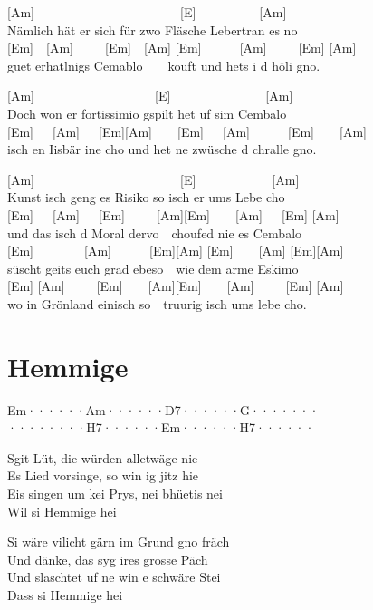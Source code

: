 \documentclass[
  letterpaper,
  a5paper]{memoir}
\begin{document}
{[}Am{]}~~~~~~~~~~~~~~~~~~~~~~~{[}E{]}~~~~~~~~~~{[}Am{]}\\
Nämlich hät er sich für zwo Fläsche Lebertran es no\\
{[}Em{]}~~{[}Am{]}~~~~~{[}Em{]}~~{[}Am{]}
{[}Em{]}~~~~~~{[}Am{]}~~~~~{[}Em{]} {[}Am{]}\\
guet erhatlnigs Cemablo~~~~kouft und hets i d höli gno.

{[}Am{]}~~~~~~~~~~~~~~~~~~~{[}E{]}~~~~~~~~~~~~~~~{[}Am{]}\\
Doch won er fortissimio gspilt het uf sim Cembalo\\
{[}Em{]}~~~{[}Am{]}~~~{[}Em{]}{[}Am{]}~~~~{[}Em{]}~~~{[}Am{]}~~~~~~{[}Em{]}~~~~{[}Am{]}\\
isch en Iisbär ine cho und het ne zwüsche d chralle gno.

{[}Am{]}~~~~~~~~~~~~~~~~~~~~~~~{[}E{]}~~~~~~~~~~~~{[}Am{]}\\
Kunst isch geng es Risiko so isch er ums Lebe cho\\
{[}Em{]}~~~{[}Am{]}~~~{[}Em{]}~~~~~{[}Am{]}{[}Em{]}~~~~{[}Am{]}~~~{[}Em{]}
{[}Am{]}\\
und das isch d Moral dervo~~choufed nie es Cembalo\\
{[}Em{]}~~~~~~~~{[}Am{]}~~~~~~{[}Em{]}{[}Am{]} {[}Em{]}~~~~{[}Am{]}
{[}Em{]}{[}Am{]}\\
süscht geits euch grad ebeso~~wie dem arme Eskimo\\
{[}Em{]}
{[}Am{]}~~~~~{[}Em{]}~~~~{[}Am{]}{[}Em{]}~~~~{[}Am{]}~~~~~{[}Em{]}
{[}Am{]}\\
wo in Grönland einisch so~~truurig isch ums lebe cho.

\hypertarget{hemmige}{%
\chapter{Hemmige}\label{hemmige}}

\textbar Em······\textbar Am······\textbar D7······\textbar G·······\textbar{}\\
\textbar········\textbar H7······\textbar Em······\textbar H7······\textbar{}

S\textquotesingle git Lüt, die würden alletwäge nie\\
Es Lied vorsinge, so win ig jitz hie\\
Eis singen um kei Prys, nei bhüetis nei\\
Wil si Hemmige hei

Si wäre vilicht gärn im Grund gno fräch\\
Und dänke, das syg ires grosse Päch\\
Und s\textquotesingle laschtet uf ne win e schwäre Stei\\
Dass si Hemmige hei
\end{document}
